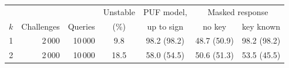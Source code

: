 \begin{tabular}{crrcccc}
\toprule
 & & & Unstable & PUF model, & \multicolumn{2}{c}{Masked response} \\
$k$ & Challenges & Queries & (\%) & up to sign & no key & key known \\
\midrule
1 & 2\,000 & 10\,000 & 9.8 & 98.2 (98.2) & 48.7 (50.9) & 98.2 (98.2) \\
\midrule
2 & 2\,000 & 10\,000 & 18.5 & 58.0 (54.5) & 50.6 (51.3) & 53.5 (45.5) \\
\bottomrule
\end{tabular}
